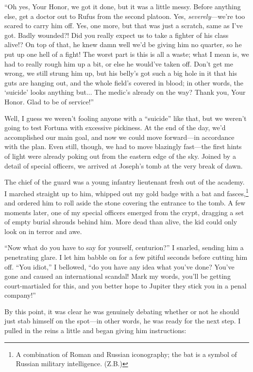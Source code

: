 ``Oh yes, Your Honor, we got it done, but it was a little messy. Before anything else, get a doctor out to Rufus from the second platoon. Yes, \emph{severely}---we're too scared to carry him off. Yes, one more, but that was just a scratch, same as I've got. Badly wounded?! Did you really expect us to take a fighter of his class alive!? On top of that, he knew damn well we'd be giving him no quarter, so he put up one hell of a fight! The worst part is this is all a waste; what I mean is, we had to really rough him up a bit, or else he would've taken off. Don't get me wrong, we still strung him up, but his belly's got such a big hole in it that his guts are hanging out, and the whole field's covered in blood; in other words, the `suicide' looks anything but... The medic's already on the way? Thank you, Your Honor. Glad to be of service!''

Well, I guess we weren't fooling anyone with a ``suicide'' like that, but we weren't going to test Fortuna with excessive pickiness. At the end of the day, we'd accomplished our main goal, and now we could move forward---in accordance with the plan. Even still, though, we had to move blazingly fast---the first hints of light were already poking out from the eastern edge of the sky. Joined by a detail of special officers, we arrived at Joseph's tomb at the very break of dawn.

The chief of the guard was a young infantry lieutenant fresh out of the academy. I marched straight up to him, whipped out my gold badge with a bat and fasces,\footnote{A combination of Roman and Russian iconography; the bat is a symbol of Russian military intelligence. (Z.B.)} and ordered him to roll aside the stone covering the entrance to the tomb. A few moments later, one of my special officers emerged from the crypt, dragging a set of empty burial shrouds behind him. More dead than alive, the kid could only look on in terror and awe.

``Now what do you have to say for yourself, centurion?'' I snarled, sending him a penetrating glare. I let him babble on for a few pitiful seconds before cutting him off. ``You idiot,'' I bellowed, ``do you have any idea what you've done? You've gone and caused an international scandal! Mark my words, you'll be getting court-martialed for this, and you better hope to Jupiter they stick you in a penal company!''

By this point, it was clear he was genuinely debating whether or not he should just stab himself on the spot---in other words, he was ready for the next step. I pulled in the reins a little and began giving him instructions:


